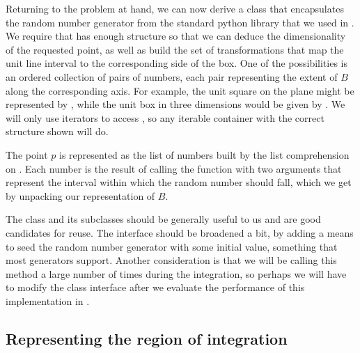 Returning to the problem at hand, we can now derive a class  that encapsulates
the random number generator from the standard python library that we used in
. We require that  has enough structure so that we can
deduce the dimensionality of the requested point, as well as build the set of transformations
that map the unit line interval to the corresponding side of the box. One of the possibilities
is an ordered collection of pairs of numbers, each pair representing the extent of $B$ along
the corresponding axis. For example, the unit square on the plane might be represented by
\literal{[[0,1], [0,1]]}, while the unit box in three dimensions would be given by
\literal{[[0,1], [0,1], [0,1]]}.  We will only use iterators to access , so any
iterable container with the correct structure shown will do.
%
%

The point $p$ is represented as the list of numbers built by the list comprehension on
. Each number is the result of calling the function
 with two arguments that represent the interval within which the
random number should fall, which we get by unpacking our representation of $B$.

The class  and its subclasses should be generally useful to us and are good
candidates for reuse. The interface should be broadened a bit, by adding a means to seed the
random number generator with some initial value, something that most generators support.
Another consideration is that we will be calling this method a large number of times during the
integration, so perhaps we will have to modify the class interface after we evaluate the
performance of this implementation in .


\subsection{Representing the region of integration}
\label{sec:classes:region}

